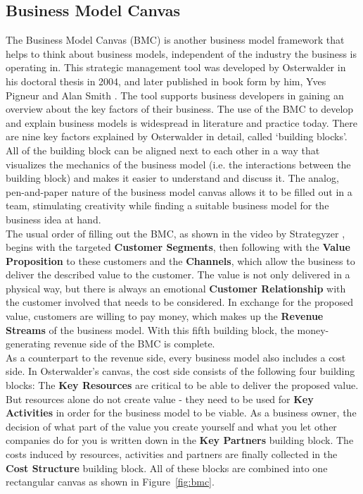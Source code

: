 	\subsection{Business Model Canvas} 
	\label{sec:bmc}
	\vspace{-1em}
		The Business Model Canvas (BMC) is another business model framework that helps to think about business models, independent of the industry the business is operating in. This strategic management tool was developed by Osterwalder in his doctoral thesis in 2004, and later published in book form by him, Yves Pigneur and Alan Smith \cite{osterwalder}. The tool supports business developers in gaining an overview about the key factors of their business. The use of the BMC to develop and explain business models is widespread in literature and practice today. There are nine key factors explained by Osterwalder in detail, called `building blocks'. All of the building block can be aligned next to each other in a way that visualizes the mechanics of the business model (i.e. the interactions between the building block) and makes it easier to understand and discuss it. The analog, pen-and-paper nature of the business model canvas allows it to be filled out in a team, stimulating creativity while finding a suitable business model for the business idea at hand.\\
		The usual order of filling out the BMC, as shown in the video by Strategyzer \cite{bmc}, begins with the targeted \textbf{Customer Segments}, then following with the \textbf{Value Proposition} to these customers and the \textbf{Channels}, which allow the business to deliver the described value to the customer. The value is not only delivered in a physical way, but there is always an emotional \textbf{Customer Relationship} with the customer involved that needs to be considered. In exchange for the proposed value, customers are willing to pay money, which makes up the \textbf{Revenue Streams} of the business model. With this fifth building block, the money-generating revenue side of the BMC is complete.\\
		As a counterpart to the revenue side, every business model also includes a cost side. In Osterwalder's canvas, the cost side consists of the following four building blocks: The \textbf{Key Resources} are critical to be able to deliver the proposed value. But resources alone do not create value - they need to be used for \textbf{Key Activities} in order for the business model to be viable. As a business owner, the decision of what part of the value you create yourself and what you let other companies do for you is written down in the \textbf{Key Partners} building block. The costs induced by resources, activities and partners are finally collected in the \textbf{Cost Structure} building block. All of these blocks are combined into one rectangular canvas as shown in Figure~\ref{fig:bmc}.

